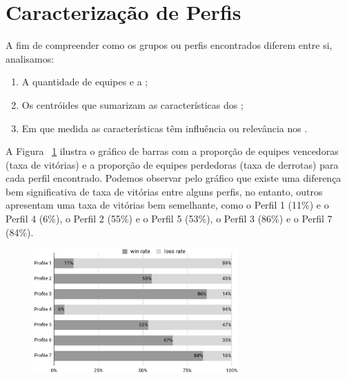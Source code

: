 \section{Caracterização de Perfis}
A fim de compreender como os grupos ou perfis encontrados diferem entre si, analisamos:

\begin{enumerate}[label=(\roman*)]
 \item A quantidade de equipes e a ;
 \item Os centróides que sumarizam as características dos ;
 \item Em que medida as características têm influência ou relevância nos .
\end{enumerate}

A Figura ~\ref{fig:win-plot} ilustra o gr\'afico de barras com a propor\c{c}\~ao de equipes vencedoras (taxa de vit\'orias) e a propor\c{c}\~ao de equipes perdedoras (taxa de derrotas) para cada perfil encontrado. Podemos observar pelo gr\'afico que existe uma diferença bem significativa de taxa de vit\'orias entre alguns perfis, no entanto, outros apresentam uma taxa de vit\'orias bem semelhante, como o Perfil 1 (11\%) e o Perfil 4 (6\%), o Perfil 2 (55\%) e o Perfil 5 (53\%), o Perfil 3 (86\%) e o Perfil 7 (84\%).

\begin{figure}
  \centering
  \includegraphics[width=0.7\textwidth]{win-rate-plot}%
  \caption{
}
  \label{fig:win-plot}
\end{figure}

